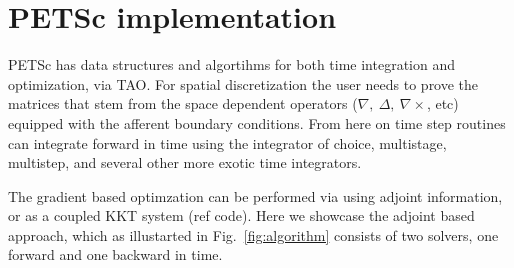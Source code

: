 \documentclass[10pt]{article}
\begin{document}
\section{PETSc implementation}

PETSc has data structures and algortihms for both time integration and optimization, via TAO.
For spatial discretization the user needs to prove the matrices that stem from the space dependent operators ($\nabla,\ \Delta,\ \nabla \times$, etc) equipped with the afferent boundary conditions. From here on time step routines can integrate forward in time using the integrator of choice, multistage, multistep, and several other more exotic time integrators.

The gradient based optimzation can be performed via using adjoint information, or as a coupled KKT system (ref code). Here we showcase the adjoint based approach, which as illustarted in Fig.~\ref{fig:algorithm} consists of two solvers, one forward and one backward in time.
\end{document}
